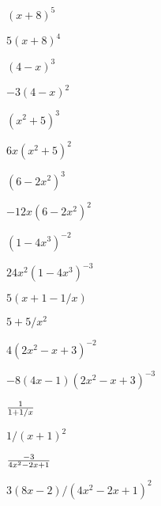 \begin{exercises}
\begin{exercise} $(x+8)^5$
\begin{answer} $5(x+8)^4$
\end{answer}\end{exercise}

\begin{exercise} $(4-x)^3$
\begin{answer} $-3(4-x)^2$
\end{answer}\end{exercise}

\begin{exercise} $(x^2+5)^3$
\begin{answer} $6x(x^2+5)^2$
\end{answer}\end{exercise}

\begin{exercise} $(6-2x^2)^3$
\begin{answer} $-12x(6-2x^2)^2$
\end{answer}\end{exercise}

\begin{exercise} $(1-4x^3)^{-2}$
\begin{answer} $24x^2(1-4x^3)^{-3}$
\end{answer}\end{exercise}

\begin{exercise} $5(x+1-1/x)$
\begin{answer} $5+5/x^2$
\end{answer}\end{exercise}

\begin{exercise} $4(2x^2-x+3)^{-2}$
\begin{answer} $-8(4x-1)(2x^2-x+3)^{-3}$
\end{answer}\end{exercise}

\begin{exercise} ${1\over 1+1/x}$
\begin{answer} $1/(x+1)^2$
\end{answer}\end{exercise}

\begin{exercise} ${-3\over 4x^2-2x+1}$
\begin{answer} $3(8x-2)/(4x^2-2x+1)^2$
\end{answer}\end{exercise}


\end{exercises}
